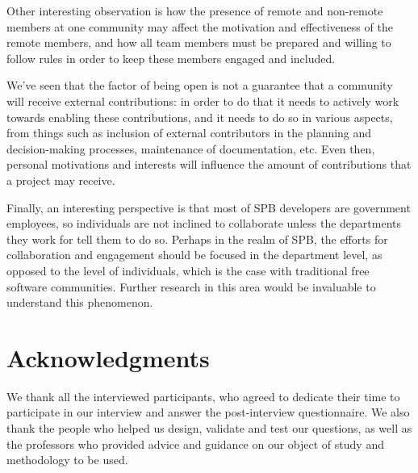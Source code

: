 \documentclass{sigchi}
\begin{document}
Other interesting observation is how the presence of remote and non-remote members at one community may affect the motivation and effectiveness of the remote members, and how all team members must be prepared and willing to follow rules in order to keep these members engaged and included.

We've seen that the factor of being open is not a guarantee that a community will receive external contributions: in order to do that it needs to actively work towards enabling these contributions, and it needs to do so in various aspects, from things such as inclusion of external contributors in the planning and decision-making processes, maintenance of documentation, etc. Even then, personal motivations and interests will influence the amount of contributions that a project may receive.

Finally, an interesting perspective is that most of SPB developers are government employees, so individuals are not inclined to collaborate unless the departments they work for tell them to do so. Perhaps in the realm of SPB, the efforts for collaboration and engagement should be focused in the department level, as opposed to the level of individuals, which is the case with traditional free software communities. Further research in this area would be invaluable to understand this phenomenon. 

\section{Acknowledgments}

We thank all the interviewed participants, who agreed to dedicate their time to participate in our interview and answer the post-interview questionnaire. We also thank the people who helped us design, validate and test our questions, as well as the professors who provided advice and guidance on our object of study and methodology to be used.


%
%
%
%
%
\balance{}



\end{document}
